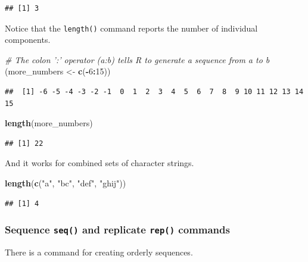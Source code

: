 \documentclass[]{article}
\newenvironment{Shaded}{\begin{snugshade}}{\end{snugshade}}
\newcommand{\KeywordTok}[1]{\textcolor[rgb]{0.13,0.29,0.53}{\textbf{#1}}}
\newcommand{\DecValTok}[1]{\textcolor[rgb]{0.00,0.00,0.81}{#1}}
\newcommand{\StringTok}[1]{\textcolor[rgb]{0.31,0.60,0.02}{#1}}
\newcommand{\CommentTok}[1]{\textcolor[rgb]{0.56,0.35,0.01}{\textit{#1}}}
\newcommand{\OperatorTok}[1]{\textcolor[rgb]{0.81,0.36,0.00}{\textbf{#1}}}
\newcommand{\NormalTok}[1]{#1}
\begin{document}
\begin{verbatim}
## [1] 3
\end{verbatim}

Notice that the \texttt{length()} command reports the number of
individual components.

\begin{Shaded}
\begin{Highlighting}[]
\CommentTok{# The colon ':' operator (a:b) tells R to generate a sequence from a to b}
\NormalTok{(more_numbers <-}\StringTok{ }\KeywordTok{c}\NormalTok{(}\OperatorTok{-}\DecValTok{6}\OperatorTok{:}\DecValTok{15}\NormalTok{))}
\end{Highlighting}
\end{Shaded}

\begin{verbatim}
##  [1] -6 -5 -4 -3 -2 -1  0  1  2  3  4  5  6  7  8  9 10 11 12 13 14 15
\end{verbatim}

\begin{Shaded}
\begin{Highlighting}[]
\KeywordTok{length}\NormalTok{(more_numbers)}
\end{Highlighting}
\end{Shaded}

\begin{verbatim}
## [1] 22
\end{verbatim}

And it works for combined sets of character strings.

\begin{Shaded}
\begin{Highlighting}[]
\KeywordTok{length}\NormalTok{(}\KeywordTok{c}\NormalTok{(}\StringTok{"a"}\NormalTok{, }\StringTok{"bc"}\NormalTok{, }\StringTok{"def"}\NormalTok{, }\StringTok{"ghij"}\NormalTok{))}
\end{Highlighting}
\end{Shaded}

\begin{verbatim}
## [1] 4
\end{verbatim}

\subsubsection{\texorpdfstring{Sequence \texttt{seq()} and replicate
\texttt{rep()}
commands}{Sequence seq() and replicate rep() commands}}\label{sequence-seq-and-replicate-rep-commands}

There is a command for creating orderly sequences.
\end{document}
